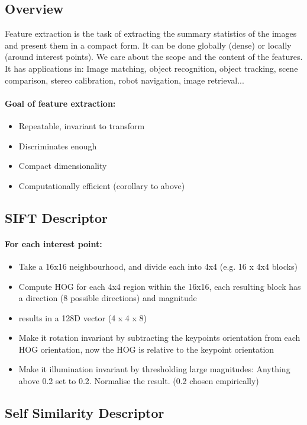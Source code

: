 \documentclass[]{article}
\begin{document}
	\subsection{Overview}
	\textnormal{Feature extraction is the task of extracting the summary statistics of the images and present them in a compact form. It can be done globally (dense) or locally (around interest points). We care about the scope and the content of the features. It has applications in: Image matching, object recognition, object tracking, scene comparison, stereo calibration, robot navigation, image retrieval...}
	\paragraph{Goal of feature extraction:}
	\begin{itemize}
		\item Repeatable, invariant to transform
		\item Discriminates enough
		\item Compact dimensionality
		\item Computationally efficient (corollary to above)
	\end{itemize}
	\subsection{SIFT Descriptor}
	\paragraph{For each interest point:}
	\begin{itemize}
		\item Take a 16x16 neighbourhood, and divide each into 4x4 (e.g. 16 x 4x4 blocks)
		\item Compute HOG for each 4x4 region within the 16x16, each resulting block has a direction (8 possible directions) and magnitude
		\item results in a 128D vector (4 x 4 x 8)
		\item Make it rotation invariant by subtracting the keypoints orientation from each HOG orientation, now the HOG is relative to the keypoint orientation
		\item Make it illumination invariant by thresholding large magnitudes: Anything above 0.2 set to 0.2. Normalise the result. (0.2 chosen empirically)
		
	\end{itemize}
	\subsection{Self Similarity Descriptor}
\end{document}

